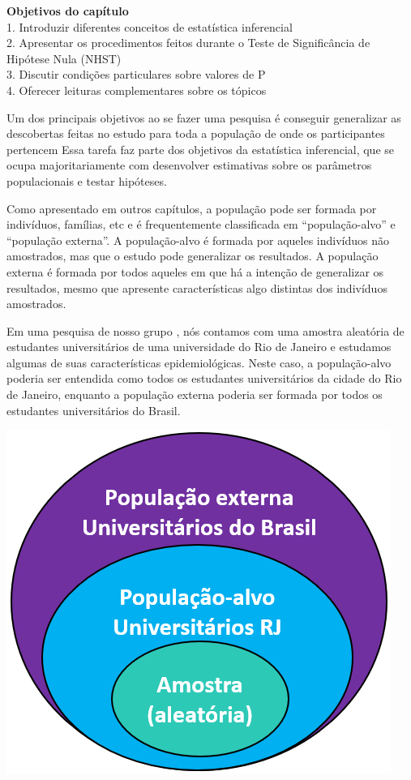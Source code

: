 \documentclass[
]{book}
\newenvironment{objectives}{
  \definecolor{shadecolor}{rgb}{0, 0, 0}  %
  \color{white}
  \begin{shaded}}
 {\end{shaded}}
\begin{document}
\begin{objectives}
\textbf{Objetivos do capítulo}\\
1. Introduzir diferentes conceitos de estatística inferencial\\
2. Apresentar os procedimentos feitos durante o Teste de Significância de Hipótese Nula (NHST)\\
3. Discutir condições particulares sobre valores de P\\
4. Oferecer leituras complementares sobre os tópicos

\end{objectives}

Um dos principais objetivos ao se fazer uma pesquisa é conseguir generalizar as descobertas feitas no estudo para toda a população de onde os participantes pertencem Essa tarefa faz parte dos objetivos da estatística inferencial, que se ocupa majoritariamente com desenvolver estimativas sobre os parâmetros populacionais e testar hipóteses.

Como apresentado em outros capítulos, a população pode ser formada por indivíduos, famílias, etc e é frequentemente classificada em ``população-alvo'' e ``população externa''. A população-alvo é formada por aqueles indivíduos não amostrados, mas que o estudo pode generalizar os resultados. A população externa é formada por todos aqueles em que há a intenção de generalizar os resultados, mesmo que apresente características algo distintas dos indivíduos amostrados.

Em uma pesquisa de nosso grupo \citep{AfonsoJunior2020}, nós contamos com uma amostra aleatória de estudantes universitários de uma universidade do Rio de Janeiro e estudamos algumas de suas características epidemiológicas. Neste caso, a população-alvo poderia ser entendida como todos os estudantes universitários da cidade do Rio de Janeiro, enquanto a população externa poderia ser formada por todos os estudantes universitários do Brasil.

\includegraphics{./img/cap_inferencia_amostra_populacao.png}
\end{document}
